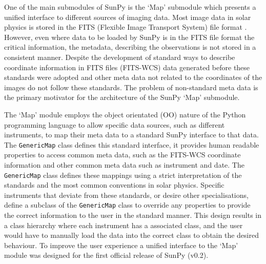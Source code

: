 \documentclass[a4paper,12pt,fourier,authoryear,custommargin]{Classes/PhDThesisPSnPDF}
\begin{document}
One of the main submodules of SunPy is the `Map' submodule which presents a unified interface to different sources of imaging data.
Most image data in solar physics is stored in the FITS (Flexible Image Transport System) file format \citep{pence2010}.
However, even where data to be loaded by SunPy is in the FITS file format the critical information, the metadata, describing the observations is not stored in a consistent manner.
Despite the development of standard ways to describe coordinate information in FITS files (FITS-WCS) \citep{greisen2002,thompson2006} data generated before these standards were adopted and other meta data not related to the coordinates of the images do not follow these standards.
The problem of non-standard meta data is the primary motivator for the architecture of the SunPy `Map' submodule.

The `Map' module employs the object orientated (OO) nature of the Python programming language to allow specific data sources, such as different instruments, to map their meta data to a standard SunPy interface to that data.
The \verb|GenericMap| class defines this standard interface, it provides human readable properties to access common meta data, such as the FITS-WCS coordinate information and other common meta data such as instrument and date.
The \verb|GenericMap| class defines these mappings using a strict interpretation of the standards and the most common conventions in solar physics.
Specific instruments that deviate from these standards, or desire other specialisations, define a subclass of the \verb|GenericMap| class to override any properties to provide the correct information to the user in the standard manner.
This design results in a class hierarchy where each instrument has a associated class, and the user would have to manually load the data into the correct class to obtain the desired behaviour.
To improve the user experience a unified interface to the `Map' module was designed for the first official release of SunPy (v0.2).
\end{document}
